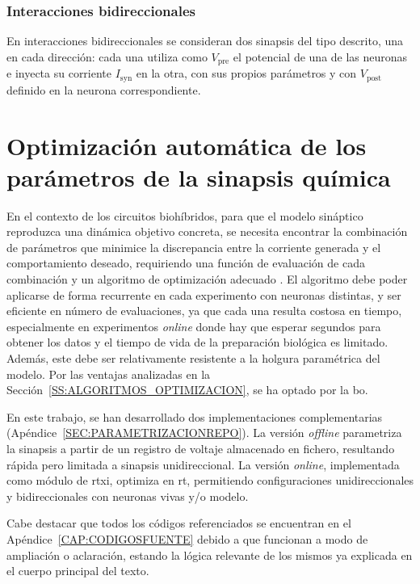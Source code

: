 \subsubsection{Interacciones bidireccionales}

En interacciones bidireccionales se consideran dos sinapsis del tipo descrito, una en cada dirección: cada una utiliza como \(V_{\mathrm{pre}}\) el potencial de una de las neuronas e inyecta su corriente \(I_{\mathrm{syn}}\) en la otra, con sus propios parámetros y con \(V_{\mathrm{post}}\) definido en la neurona correspondiente.


\section{Optimización automática de los parámetros de la sinapsis química\label{SEC:OPTIMIZACION_AUTOMATICA}}

En el contexto de los circuitos biohíbridos, para que el modelo sináptico reproduzca una dinámica objetivo concreta, se necesita encontrar la combinación de parámetros que minimice la discrepancia entre la corriente generada y el comportamiento deseado, requiriendo una función de evaluación de cada combinación y un algoritmo de optimización adecuado \cite{ReyesSnchez2023}. El algoritmo debe poder aplicarse de forma recurrente en cada experimento con neuronas distintas, y ser eficiente en número de evaluaciones, ya que cada una resulta costosa en tiempo, especialmente en experimentos \textit{online} donde hay que esperar segundos para obtener los datos y el tiempo de vida de la preparación biológica es limitado. Además, este debe ser relativamente resistente a la holgura paramétrica del modelo. Por las ventajas analizadas en la Sección~\ref{SS:ALGORITMOS_OPTIMIZACION}, se ha optado por la \ac{bo}.

En este trabajo, se han desarrollado dos implementaciones complementarias (Apéndice~\ref{SEC:PARAMETRIZACIONREPO}). La versión \textit{offline} parametriza la sinapsis a partir de un registro de voltaje almacenado en fichero, resultando rápida pero limitada a sinapsis unidireccional. La versión \textit{online}, implementada como módulo de \ac{rtxi}, optimiza en \ac{rt}, permitiendo configuraciones unidireccionales y bidireccionales con neuronas vivas y/o modelo.

Cabe destacar que todos los códigos referenciados se encuentran en el Apéndice~\ref{CAP:CODIGOSFUENTE} debido a que funcionan a modo de ampliación o aclaración, estando la lógica relevante de los mismos ya explicada en el cuerpo principal del texto.

